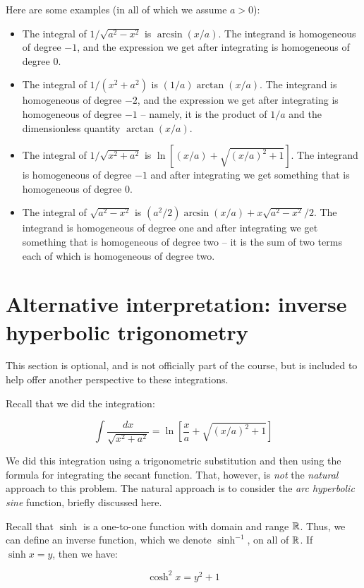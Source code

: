\documentclass[10pt]{amsart}
\begin{document}
Here are some examples (in all of which we assume $a > 0$):

\begin{itemize}
\item The integral of $1/\sqrt{a^2 - x^2}$ is $\arcsin(x/a)$. The
  integrand is homogeneous of degree $-1$, and the expression we get
  after integrating is homogeneous of degree $0$.
\item The integral of $1/(x^2 + a^2)$ is $(1/a) \arctan(x/a)$. The
  integrand is homogeneous of degree $-2$, and the expression we get
  after integrating is homogeneous of degree $-1$ -- namely, it is the
  product of $1/a$ and the dimensionless quantity $\arctan(x/a)$.
\item The integral of $1/\sqrt{x^2 + a^2}$ is $\ln[(x/a) +
  \sqrt{(x/a)^2 + 1}]$. The integrand is homogeneous of degree $-1$
  and after integrating we get something that is homogeneous of degree
  $0$.
\item The integral of $\sqrt{a^2 - x^2}$ is $(a^2/2) \arcsin(x/a) +
  x\sqrt{a^2 - x^2}/2$. The integrand is homogeneous of degree one and
  after integrating we get something that is homogeneous of degree two
  -- it is the sum of two terms each of which is homogeneous of degree
  two.
\end{itemize}

\section{Alternative interpretation: inverse hyperbolic trigonometry}

This section is optional, and is not officially part of the course,
but is included to help offer another perspective to these
integrations.

Recall that we did the integration:

$$\int \frac{dx}{\sqrt{x^2 + a^2}} = \ln\left[\frac{x}{a} + \sqrt{(x/a)^2 + 1}\right]$$

We did this integration using a trigonometric substitution and then
using the formula for integrating the secant function. That, however,
is {\em not} the {\em natural} approach to this problem. The natural
approach is to consider the {\em arc hyperbolic sine} function,
briefly discussed here.

Recall that $\sinh$ is a one-to-one function with domain and range
$\mathbb{R}$. Thus, we can define an inverse function, which we denote
$\sinh^{-1}$, on all of $\mathbb{R}$. If $\sinh x = y$, then we have:

$$\cosh^2x = y^2 + 1$$
\end{document}

